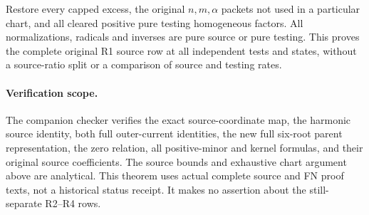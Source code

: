 Restore every capped excess, the original $n,m,\alpha$ packets
not used in a particular chart, and all cleared positive pure
testing homogeneous factors.  All normalizations, radicals and
inverses are pure source or pure testing.  This proves the
complete original R1 source row at all independent tests and
states, without a source-ratio split or a comparison of source
and testing rates.

\paragraph{Verification scope.}
The companion checker verifies the exact source-coordinate map,
the harmonic source identity, both full outer-current identities,
the new full six-root parent representation, the zero relation,
all positive-minor and kernel formulas, and their original
source coefficients.  The source bounds and exhaustive chart
argument above are analytical.  This theorem uses actual complete
source and FN proof texts, not a historical status receipt.
It makes no assertion about the still-separate R2--R4 rows.
